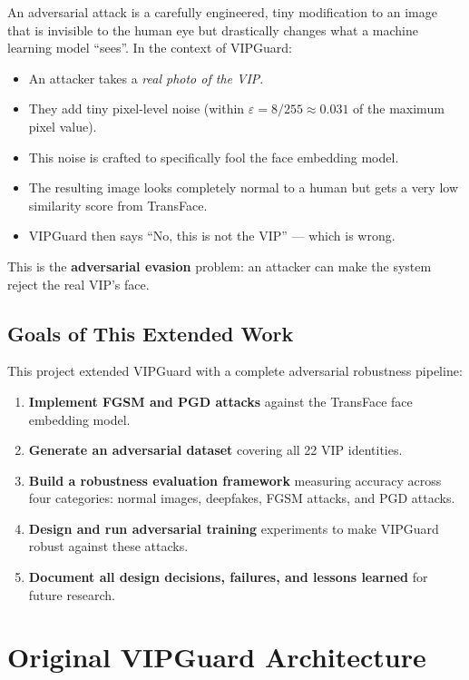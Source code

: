 \documentclass[12pt,a4paper]{article}
\begin{document}
An adversarial attack is a carefully engineered, tiny modification to an image that is invisible to the human eye but drastically changes what a machine learning model ``sees''. In the context of VIPGuard:

\begin{itemize}
    \item An attacker takes a \textit{real photo of the VIP}.
    \item They add tiny pixel-level noise (within $\varepsilon = 8/255 \approx 0.031$ of the maximum pixel value).
    \item This noise is crafted to specifically fool the face embedding model.
    \item The resulting image looks completely normal to a human but gets a very low similarity score from TransFace.
    \item VIPGuard then says ``No, this is not the VIP'' --- which is wrong.
\end{itemize}

This is the \textbf{adversarial evasion} problem: an attacker can make the system reject the real VIP's face.

\subsection{Goals of This Extended Work}

This project extended VIPGuard with a complete adversarial robustness pipeline:

\begin{enumerate}
    \item \textbf{Implement FGSM and PGD attacks} against the TransFace face embedding model.
    \item \textbf{Generate an adversarial dataset} covering all 22 VIP identities.
    \item \textbf{Build a robustness evaluation framework} measuring accuracy across four categories: normal images, deepfakes, FGSM attacks, and PGD attacks.
    \item \textbf{Design and run adversarial training} experiments to make VIPGuard robust against these attacks.
    \item \textbf{Document all design decisions, failures, and lessons learned} for future research.
\end{enumerate}

\section{Original VIPGuard Architecture}
\end{document}
